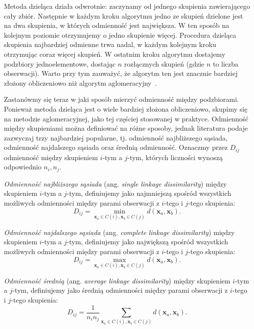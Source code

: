 \documentclass{praca1}
\begin{document}
Metoda dzieląca działa odwrotnie: zaczynamy od jednego skupienia zawierającego cały zbiór. Następnie w każdym kroku algorytmu jedno ze skupień dzielone jest na dwa skupienia, w których odmienność jest największa. W ten sposób na kolejnym poziomie otrzymujemy o jedno skupienie więcej. Procedura dzieląca skupienia najbardziej odmienne trwa nadal, w każdym kolejnym kroku otrzymując coraz więcej skupień. W ostatnim kroku algorytmu dostajemy podzbiory jednoelementowe, dostając $n$ rozłącznych skupień (gdzie $n$ to liczba obserwacji). Warto przy tym zauważyć, że algorytm ten jest znacznie bardziej złożony obliczeniowo niż algorytm aglomeracyjny~\cite{Hastie2009:elements, Koronacki2005:statystyczne}.

Zastanówmy się teraz w jaki sposób mierzyć odmienność między podzbiorami. Ponieważ metoda dzieląca jest o wiele bardziej złożona obliczeniowo, skupimy się na metodzie aglomeracyjnej, jako tej częściej stosowanej w praktyce. Odmienność między skupieniami można definiować na różne sposoby, jednak literatura podaje zazwyczaj trzy najbardziej popularne, tj. odmienność najbliższego sąsiada, odmienność najdalszego sąsiada oraz średnią odmienność. Oznaczmy przez $D_{ij}$ odmienność między skupieniem $i$-tym a $j$-tym, których liczności wynoszą odpowiednio $n_i, n_j$\cite{Hastie2009:elements, Koronacki2005:statystyczne}.

\begin{definition}
\emph{Odmienność najbliższego sąsiada} (ang. \emph{single linkage dissimilarity}) między skupieniem $i$-tym a $j$-tym, definiujemy jako najmniejszą spośród wszystkich możliwych odmienności między parami obserwacji z $i$-tego i $j$-tego skupienia:
$$
D_{ij} = \min\limits_{\mathbf{x}_a \in C(i), \mathbf{x}_b \in C(j)}d(\mathbf{x}_a, \mathbf{x}_b).
$$
\end{definition}

\begin{definition}
\emph{Odmienność najdalszego sąsiada} (ang. \emph{complete linkage dissimilarity}) między skupieniem $i$-tym a $j$-tym, definiujemy jako największą spośród wszystkich możliwych odmienności między parami obserwacji z $i$-tego i $j$-tego skupienia:
$$
D_{ij} = \max\limits_{\mathbf{x}_a \in C(i), \mathbf{x}_b \in C(j)}d(\mathbf{x}_a, \mathbf{x}_b).
$$
\end{definition}

\begin{definition}
\emph{Odmienność średnią} (ang. \emph{average linkage dissimilarity}) między skupieniem $i$-tym a $j$-tym, definiujemy jako średnią odmienności między parami obserwacji z $i$-tego i $j$-tego skupienia:
$$
D_{ij} = \frac{1}{n_i n_j}\sum\limits_{\mathbf{x}_a \in C(i), \mathbf{x}_b \in C(j)}d(\mathbf{x}_a, \mathbf{x}_b).
$$
\end{definition}
\end{document}
